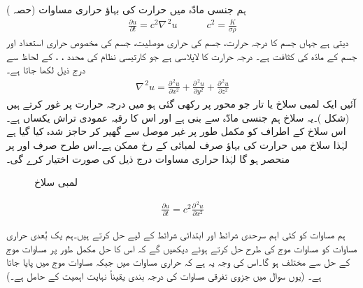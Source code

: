 ہم جنسی مادّہ میں حرارت کی بہاؤ حراری مساوات (حصہ )
\begin{align*}
\frac{\partial u}{\partial t}=c^2\nabla^{\,2}u\quad \quad \quad c^2=\frac{K}{\sigma \rho}
\end{align*}
دیتی ہے جہاں  جسم کا درجہ حرارت،  جسم کی  حراری موصلیت،  جسم کی مخصوص حراری استعداد اور  جسم کے مادّہ کی کثافت ہے۔  درجہ حرارت  کا لاپلاسی ہے جو کارتیسی نظام کی محدد ، ،  کے لحاظ سے درج ذیل لکھا جاتا ہے۔
\begin{align*}
\nabla^{\,2}u=\frac{\partial^{\,2}u}{\partial x^2}+\frac{\partial^{\,2}u}{\partial y^2}+\frac{\partial^{\,2} u}{\partial z^2}
\end{align*}
آئیں ایک لمبی سلاخ یا تار جو محور  پر رکھی گئی ہو میں درجہ حرارت پر غور کرتے ہیں (شکل )۔یہ سلاخ ہم جنسی مادّہ سے بنی ہے اور اس کا رقبہ عمودی تراش  یکساں ہے۔اس سلاخ کے اطراف کو مکمل طور پر غیر موصل سے گھیر کر حاجز شدہ کیا گیا ہے لہٰذا سلاخ میں حرارت کی بہاؤ صرف لمبائی کے رخ ممکن ہے۔اس طرح  صرف  اور  پر منحصر ہو گا لہٰذا حراری مساوات درج ذیل  کی صورت اختیار کرے گی۔
\begin{figure}
\centering
{}
\caption{لمبی سلاخ}
\label{شکل_جزوی_لمبی_سلاخ}
\end{figure}
%
\begin{align}\label{مساوات_جزوی_حراری_الف}
\frac{\partial u}{\partial t}=c^2\frac{\partial^{\,2}u}{\partial x^2}
\end{align}

ہم مساوات  کو کئی اہم سرحدی شرائط اور ابتدائی شرائط کے لیے حل کرتے ہیں۔ہم یک بُعدی حراری مساوات کو  مساوات موج کی طرح حل کرتے ہوئے دیکھیں گے کہ اس کا حل مکمل طور پر مساوات موج کے حل سے مختلف ہو گا۔اس کی وجہ یہ ہے کہ حراری مساوات میں  جبکہ مساوات موج میں  پایا جاتا ہے۔ (یوں سوال  میں جزوی تفرقی مساوات کی درجہ بندی یقیناً نہایت اہمیت کے حامل ہے۔)


